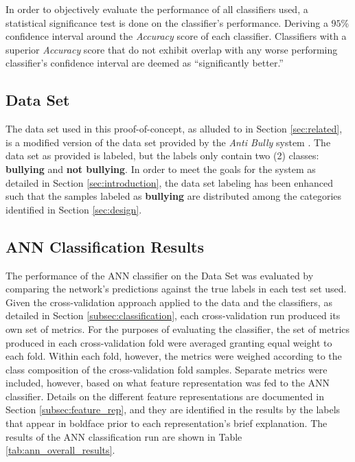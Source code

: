 \documentclass[conference]{sig-alternate-05-2015}
\begin{document}
In order to objectively evaluate the performance of all classifiers used, a
statistical significance test is done on the classifier's performance. Deriving
a $95$\% confidence interval around the \textit{Accuracy} score of each
classifier. Classifiers with a superior \textit{Accuracy} score that do not
exhibit overlap with any worse performing classifier's confidence interval are
deemed as ``significantly better.''

\subsection{Data Set}\label{subsec:eval_dataset}
The data set used in this proof-of-concept, as alluded to in Section
\ref{sec:related}, is a modified version of the data set provided by the
\textit{Anti Bully} system \cite{Li2016}. The data set as provided is labeled,
but the labels only contain two (2) classes: \textbf{bullying} and
\textbf{not bullying}. In order to meet the goals for the system as detailed in
Section \ref{sec:introduction}, the data set labeling has been
enhanced such that the samples labeled as \textbf{bullying} are distributed
among the categories identified in Section \ref{sec:design}.

\subsection{ANN Classification Results}\label{subsec:ann_results}
The performance of the ANN classifier on the Data Set was evaluated by comparing
the network's predictions against the true labels in each test set used. Given
the cross-validation approach applied to the data and the classifiers, as
detailed in Section \ref{subsec:classification}, each cross-validation run
produced its own set of metrics. For the purposes of evaluating the classifier,
the set of metrics produced in each cross-validation fold were averaged granting
equal weight to each fold. Within each fold, however, the metrics were weighed
according to the class composition of the cross-validation fold samples.
Separate metrics were included, however, based on what feature representation
was fed to the ANN classifier. Details on the different feature representations
are documented in Section \ref{subsec:feature_rep}, and they are identified in
the results by the labels that appear in boldface prior to each representation's
brief explanation. The results of the ANN classification run are shown in Table
\ref{tab:ann_overall_results}.
\end{document}
